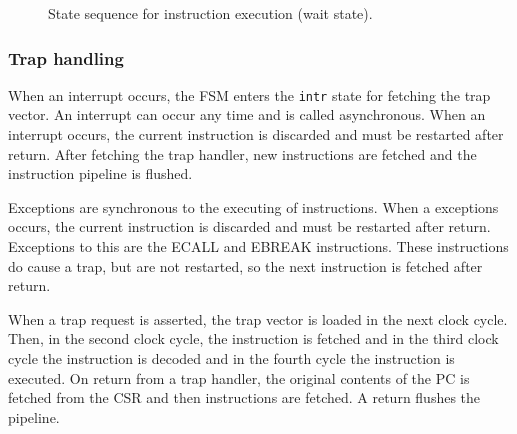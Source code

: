 \documentclass[12pt]{article}
\begin{document}
\begin{figure}[!ht]
\centering
{}
\caption{State sequence for instruction execution (wait state).}
\label{fsmpipeseqwait}
\end{figure}

\subsubsection{Trap handling}
When an interrupt occurs, the FSM enters the \texttt{intr} state for fetching the trap vector. An interrupt can occur any time and is called asynchronous. When an interrupt occurs,
the current instruction is discarded and must be restarted after return. After fetching the trap handler, new instructions are fetched and the instruction pipeline is flushed.

Exceptions are synchronous to the executing of instructions. When a exceptions occurs, the current instruction is discarded and must be restarted after return. Exceptions to this are the ECALL and EBREAK instructions. These instructions do cause a trap, but are not restarted, so the next instruction is fetched after return.

When a trap request is asserted, the trap vector is loaded in the next clock cycle. Then, in the second clock cycle, the instruction is fetched and in the third clock cycle the instruction is decoded and in the fourth cycle the instruction is executed. On return from a trap handler, the original contents of the PC is fetched from the CSR and then instructions are fetched. A return flushes the pipeline.
\end{document}
